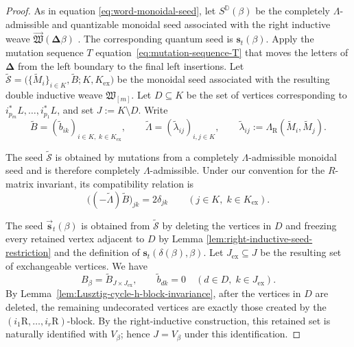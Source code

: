 \documentclass[12pt, reqno]{amsart}
\theoremstyle{plain}
\theoremstyle{definition}
\numberwithin{equation}{section}
\newcommand{\DD}{\mathbb{D}}
\newcommand{\LambdaR}{\Lambda_{\mathrm R}}
\begin{document}
\begin{proof}
As in equation \eqref{eq:word-monoidal-seed}, let
\(
    S^{\DD}(\beta)
\)
be the completely \(\Lambda\)-admissible and quantizable monoidal seed
associated with the right inductive weave
\(\overrightarrow{\mathfrak W}(\boldsymbol{\Delta}\beta)\) . The corresponding quantum seed is $\mathbf{s}_t(\beta)$. Apply the
mutation sequence \(T\) equation~\eqref{eq:mutation-sequence-T} that moves the letters of
\(\boldsymbol{\Delta}\) from the left boundary to the final left
insertions.
Let
\(
    \widetilde{\mathcal S}
    =
    \bigl(
        \{\widetilde M_i\}_{i\in K},
        \widetilde B;
        K,K_{\mathrm{ex}}
    \bigr)
\)
be the monoidal seed associated with the resulting double inductive
weave $\mathfrak W_{[m]}$. Let
\(D\subseteq K\) be the set of vertices corresponding to
\(i_{p_m}^*L,\ldots,i_{p_1}^*L\), and set \(J:=K\setminus D\). Write
\begin{equation*}
    \widetilde B
    =(\widetilde b_{ik})_{
       i\in K,\;k\in K_{\mathrm{ex}}},
    \qquad
    \widetilde\Lambda
    =(\widetilde\lambda_{ij})_{i,j\in K},
    \qquad
    \widetilde\lambda_{ij}
    :=\LambdaR(\widetilde M_i,\widetilde M_j).
\end{equation*}

The seed \(\widetilde{\mathcal S}\) is obtained by mutations from a
completely \(\Lambda\)-admissible monoidal seed and is therefore
completely \(\Lambda\)-admissible. Under our convention for the
\(R\)-matrix invariant, its compatibility relation is
\begin{equation}\label{eq:full-seed-compatibility}
    \bigl((-\widetilde\Lambda)\widetilde B\bigr)_{jk}
    =2\delta_{jk}
    \qquad
    (j\in K,\;k\in K_{\mathrm{ex}}).
\end{equation}

The seed \(\overrightarrow{\mathbf s}_t(\beta)\) is obtained from
\(\widetilde{\mathcal S}\) by deleting the vertices in \(D\) and
freezing every retained vertex adjacent to \(D\) by Lemma
\ref{lem:right-inductive-seed-restriction} and the definition of
\(\mathbf s_t(\delta(\beta),\beta)\). Let
\(J_{\mathrm{ex}}\subseteq J\) be the resulting set of exchangeable
vertices.  We have
\begin{equation}\label{eq:B-beta-restriction}
    B_\beta
    =\widetilde B_{J\times J_{\mathrm{ex}}},
    \qquad
    \widetilde b_{dk}=0
    \quad
    (d\in D,\;k\in J_{\mathrm{ex}}).
\end{equation}
By Lemma~\ref{lem:Lusztig-cycle-h-block-invariance}, after the vertices in \(D\) are deleted, the remaining
undecorated vertices are exactly those created by the
\((i_1\mathrm R,\ldots,i_r\mathrm R)\)-block. By the
right-inductive construction, this retained set is naturally identified
with \(V_\beta\); hence \(J=V_\beta\) under this identification.


\end{proof}
\end{document}
